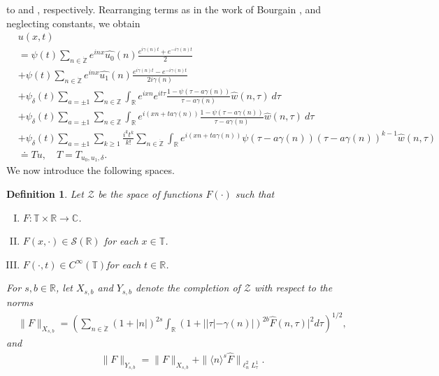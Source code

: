 \documentclass[12pt,reqno]{amsart}
\numberwithin{equation}{section}  %
\renewcommand{\cref}{\Cref}
\newcommand{\rr}{\mathbb{R}}
\newcommand{\zz}{\mathbb{Z}}
\newcommand{\cc}{\mathbb{C}}
\newcommand{\ci}{\mathbb{T}}
\newcommand{\zzdot}{\dot{\zz}}
\newcommand{\wh}{\widehat}
\newtheorem{definition}[theorem]{Definition}
\begin{document}
to \cref{term-3} and \cref{term-4}, respectively.
Rearranging terms as in the work of Bourgain \cite{Bourgain:1993ju}, and neglecting constants, we obtain
\begin{align}
& u(x,t)
\label{main1-rel-term-0}
\\
\label{main1-rel-term-1}
& = \psi(t) \sum_{n \in \zzdot} e^{inx} \wh{u_{0}}(n) \frac{e^{i\gamma(n)t} + e^{-i\gamma(n)t}}{2} 
\\
\label{main1-rel-term-2}
& + \psi(t) \sum_{n \in \zzdot} e^{inx}
\wh{u_{1}}(n)\frac{e^{i\gamma(n)t} - e^{-i\gamma(n)t}}{2 i \gamma(n)} 
\\
\label{main1-rel-term-3}
& +  \psi_{\delta}(t)\sum_{a = \pm 1} \sum_{n\in \zz} \int_\rr e^{ixn}  
e^{it \tau} \frac{1 - \psi(\tau -  a\gamma(n)) 
}{\tau -  a\gamma(n)} \wh{w}(n, \tau) \ d \tau
\\
\label{main1-rel-term-4}
& + \psi_{\delta}(t) \sum_{a = \pm 1} \sum_{n\in \zz} \int_\rr e^{i(xn + 
t a\gamma(n))}
\frac{1- \psi(\tau -  a\gamma(n))}{\tau -  a\gamma(n)} \wh{w}(n, \tau) \ d \tau
\\
\label{main1-rel-term-4.5}
& +  \psi_{\delta}(t) \sum_{a = \pm 1}  \sum_{k \ge 1} \frac{i^k t^k}{k!}
\sum_{n \in \zzdot} \int_\rr e^{i(xn + t a\gamma(n) )}
\psi(\tau -  a\gamma(n)) (\tau -  a\gamma(n))^{k-1} \wh{w}(n, \tau)
\\
\label{main1-rel-term-5}
& \doteq Tu, \quad T=T_{u_0, u_1, \delta}.
\end{align}
We now introduce the following spaces. 
\begin{definition}
Let $\mathcal{Z}$ be the space of functions $F(\cdot)$ such that
\begin{enumerate}[(I)]
\item{$F: \ci \times \rr \to \cc$}.
\item{$F(x, \cdot) \in \mathcal{S}(\rr)$ for each $x \in \ci$}.
\item{$F(\cdot, t) \in C^{\infty}(\ci)$for each $t \in \rr$}.
\end{enumerate}
For $s, b \in \rr$, let $X_{s,b}$ and $Y_{s,b}$ denote the completion of $\mathcal{Z}$ with
respect to the norms
\begin{equation}
\begin{split}
\|F\|_{X_{s,b}} = \left( \sum_{n \in \zzdot} (1 + |n|)^{2s} \int_{\rr}
(1 + ||\tau| - \gamma(n) |)^{2b} \wh{F}(n, \tau)|^{2} d \tau\right)^{1/2},
\end{split}
\label{eqn:bous-norm}
\end{equation}
and
\begin{equation*}
\begin{split}
\|F\|_{Y_{s,b}} = \|F\|_{X_{s,b}} + \|\langle n \rangle^s \wh{F}\|_{\ell^{2}_{n} L^1_\tau }.
\end{split}
\end{equation*}
\end{definition}
\end{document}
